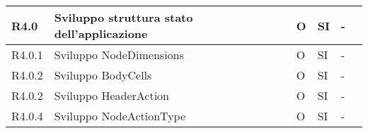 \begin{longtable} {
		|>{}p{10mm}| 
		|>{}p{60mm}|
		|>{}p{15mm}|
		|>{}p{15mm}|
		|>{}p{15mm}|
		>{}p{0mm}}
	R4.0 & Sviluppo struttura stato dell'applicazione & O & SI & - \\ \hline
	R4.0.1 & Sviluppo NodeDimensions & O & SI & - \\ \hline
	R4.0.2 & Sviluppo BodyCells & O & SI & - \\ \hline
	R4.0.2 & Sviluppo HeaderAction & O & SI & - \\ \hline
	R4.0.4 & Sviluppo NodeActionType & O & SI & - \\ \hline
	
	
	
	\hline
\end{longtable}